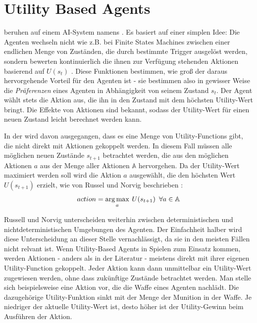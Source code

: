 \section{Utility Based Agents}\label{utility_agents}
 beruhen auf einem AI-System namens . Es basiert auf einer simplen Idee: Die Agenten wechseln nicht wie z.B. bei Finite States Machines zwischen einer endlichen Menge von Zuständen, die durch bestimmte Trigger ausgelöst werden, sondern bewerten kontinuierlich die ihnen zur Verfügung stehenden Aktionen basierend auf  $U(s_t)$ \cite{art_int_mod_app} \cite{utility_based_agents_2}. Diese Funktionen bestimmen, wie groß der daraus hervorgehende Vorteil für den Agenten ist - sie bestimmen also in gewisser Weise die \textit{Präferenzen} eines Agenten in Abhängigkeit von seinem Zustand $s_t$. Der Agent wählt stets die Aktion aus, die ihn in den Zustand mit dem höchsten Utility-Wert bringt. Die Effekte von Aktionen sind bekannt, sodass der Utility-Wert für einen neuen Zustand leicht berechnet werden kann.

In der  wird davon ausgegangen, dass es eine Menge von Utility-Functions gibt, die nicht direkt mit Aktionen gekoppelt werden. In diesem Fall müssen alle möglichen neuen Zustände $s_{t+1}$ betrachtet werden, die aus den möglichen Aktionen $a$ aus der Menge aller Aktionen $\mathbb{A}$ hervorgehen. Da der Utility-Wert maximiert werden soll wird die Aktion $a$ ausgewählt, die den höchsten Wert $U(s_{t+1})$ erzielt, wie von Russel und Norvig beschrieben \cite{art_int_mod_app}:
$$ action = \operatorname*{arg\,max}_a \: U(s_{t+1}) \:\;  \forall{a}	\in{\mathbb{A}} $$

Russell und Norvig unterscheiden weiterhin zwischen deterministischen und nichtdeterministischen Umgebungen des Agenten. Der Einfachheit halber wird diese Unterscheidung an dieser Stelle vernachlässigt, da sie in den meisten Fällen nicht relvant ist.
Wenn Utility-Based Agents in Spielen zum Einsatz kommen, werden Aktionen - anders als in der Literatur - meistens direkt mit ihrer eigenen Utility-Function gekoppelt. Jeder Aktion kann dann unmittelbar ein Utility-Wert zugewiesen werden, ohne dass zukünftige Zustände betrachtet werden. Man stelle sich beispielsweise eine Aktion vor, die die Waffe eines Agenten nachlädt. Die dazugehörige Utility-Funktion  sinkt mit der Menge der Munition in der Waffe. Je niedriger der aktuelle Utility-Wert ist, desto höher ist der Utility-Gewinn beim Ausführen der Aktion.

